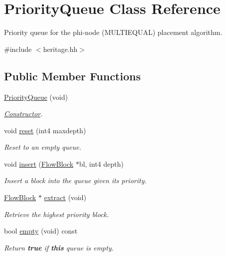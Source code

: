 \hypertarget{class_priority_queue}{}\section{Priority\+Queue Class Reference}
\label{class_priority_queue}


Priority queue for the phi-\/node (M\+U\+L\+T\+I\+E\+Q\+U\+AL) placement algorithm.  




{\ttfamily \#include $<$heritage.\+hh$>$}

\subsection*{Public Member Functions}
\begin{DoxyCompactItemize}
\item 
\mbox{\hyperlink{class_priority_queue_ad59a188ea9e264c9d8567213d128dfd4}{Priority\+Queue}} (void)
\begin{DoxyCompactList}\small\item\em \mbox{\hyperlink{class_constructor}{Constructor}}. \end{DoxyCompactList}\item 
void \mbox{\hyperlink{class_priority_queue_a75ec253ec066ea6dc172f1f8bd88758b}{reset}} (int4 maxdepth)
\begin{DoxyCompactList}\small\item\em Reset to an empty queue. \end{DoxyCompactList}\item 
void \mbox{\hyperlink{class_priority_queue_a8abe49ecb70033726324497f4aafdb74}{insert}} (\mbox{\hyperlink{class_flow_block}{Flow\+Block}} $\ast$bl, int4 depth)
\begin{DoxyCompactList}\small\item\em Insert a block into the queue given its priority. \end{DoxyCompactList}\item 
\mbox{\hyperlink{class_flow_block}{Flow\+Block}} $\ast$ \mbox{\hyperlink{class_priority_queue_a6cd7194cc2cb973f33158a1d7dc7acc9}{extract}} (void)
\begin{DoxyCompactList}\small\item\em Retrieve the highest priority block. \end{DoxyCompactList}\item 
bool \mbox{\hyperlink{class_priority_queue_aa52c8c07deead26f255cdbe92a0acd4e}{empty}} (void) const
\begin{DoxyCompactList}\small\item\em Return {\bfseries{true}} if {\bfseries{this}} queue is empty. \end{DoxyCompactList}\end{DoxyCompactItemize}



